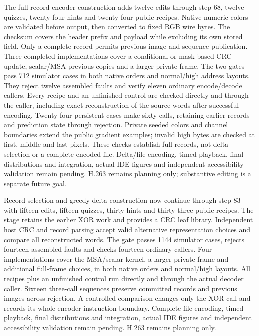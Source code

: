 The full-record encoder construction adds twelve edits through step 68, twelve
quizzes, twenty-four hints and twenty-four public recipes. Native numeric colors
are validated before output, then converted to fixed RGB wire bytes. The checksum
covers the header prefix and payload while excluding its own stored field. Only a
complete record permits previous-image and sequence publication. Three completed
implementations cover a conditional or mask-based CRC update, scalar/MSA previous
copies and a larger private frame. The two gates pass 712 simulator cases in both
native orders and normal/high address layouts. They reject twelve assembled faults
and verify eleven ordinary encode/decode callers. Every recipe and an unfinished
control are checked directly and through the caller, including exact reconstruction
of the source words after successful encoding. Twenty-four persistent cases make
sixty calls, retaining earlier records and prediction state through rejection.
Private seeded colors and channel boundaries extend the public gradient examples;
invalid high bytes are checked at first, middle and last pixels. These checks
establish full records, not delta selection or a complete encoded file. Delta/file
encoding, timed playback, final distributions and integration, actual IDE figures
and independent accessibility validation remain pending. H.263 remains planning
only; substantive editing is a separate future goal.

Record selection and greedy delta construction now continue through step 83 with
fifteen edits, fifteen quizzes, thirty hints and thirty-three public recipes. The stage retains the earlier XOR work and provides a CRC leaf library.
Independent host CRC and record parsing accept valid alternative representation
choices and compare all reconstructed words. The gate passes 1144 simulator cases,
rejects fourteen assembled faults and checks fourteen ordinary callers. Four
implementations cover the MSA/scalar kernel, a larger private frame and additional
full-frame choices, in both native orders and normal/high layouts. All recipes plus
an unfinished control run directly and through the actual decoder caller. Sixteen
three-call sequences preserve committed records and previous images across rejection.
A controlled comparison changes only the XOR call and records its whole-encoder
instruction boundary. Complete-file encoding, timed playback, final distributions
and integration, actual IDE figures and independent accessibility validation remain
pending. H.263 remains planning only.


